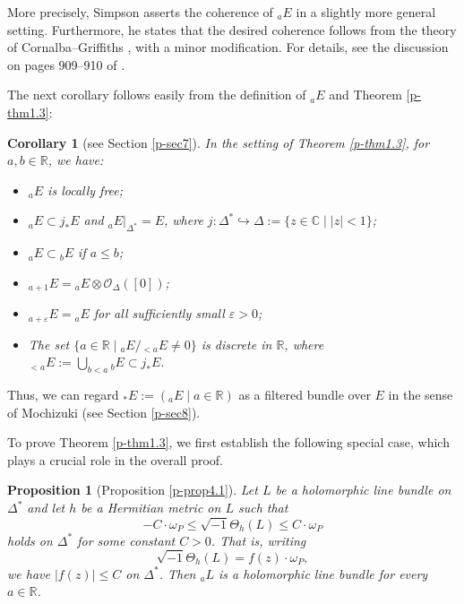 \documentclass[12pt,twoside]{amsart}
\newtheorem{cor}[thm]{Corollary}
\newtheorem{prop}[thm]{Proposition}
\theoremstyle{definition}
\begin{document}
More precisely, Simpson asserts the 
coherence of ${}_a E$ in a slightly more general setting.
Furthermore, he states that the desired coherence 
follows from the theory 
of Cornalba--Griffiths \cite{cornalba-griffiths}, with a minor modification. 
For details, see the discussion on pages 909--910 of \cite{simpson1}.

The next corollary follows easily from the definition of ${}_a E$ and Theorem \ref{p-thm1.3}:

\begin{cor}[see Section \ref{p-sec7}]\label{p-cor1.4}
In the setting of Theorem \ref{p-thm1.3}, for $a, b \in \mathbb{R}$, we have:
\begin{itemize}
\item[(i)] ${}_a E$ is locally free;
\item[(ii)] ${}_a E \subset j_*E$ and 
${}_a E|_{\Delta^*} = E$, where 
$j\colon \Delta^* \hookrightarrow \Delta := \{z \in \mathbb{C} \mid |z| < 1\}$;
\item[(iii)] ${}_a E \subset {}_b E$ if $a \leq b$;
\item[(iv)] ${}_{a+1}E = {}_a E \otimes \mathcal{O}_\Delta([0])$;
\item[(v)] ${}_{a+\varepsilon}E = {}_a E$ for 
all sufficiently small $\varepsilon > 0$;
\item[(vi)] The set $\{a \in \mathbb{R} \mid {}_a E / {}_{<a} E \neq 0\}$ 
is discrete in $\mathbb{R}$, 
where ${}_{<a} E := \bigcup_{b < a} {}_b E \subset j_*E$.
\end{itemize}
\end{cor}

Thus, we can regard ${}_\ast E 
:= \left( {}_a E \mid a \in \mathbb{R} \right)$ 
as a filtered bundle over $E$ in the sense of Mochizuki 
(see Section \ref{p-sec8}).

To prove Theorem \ref{p-thm1.3}, we first 
establish the following special case, which plays a crucial role in the overall proof.

\begin{prop}[Proposition \ref{p-prop4.1}]\label{p-prop1.5} 
Let $L$ be a holomorphic line bundle 
on $\Delta^*$ and let $h$ be a Hermitian metric on $L$ such that
\[
-C \cdot \omega_P \leq \sqrt{-1} \Theta_h(L) \leq C \cdot \omega_P
\]
holds on $\Delta^*$ for some constant $C > 0$.
That is, writing
\[
\sqrt{-1} \Theta_h(L) = f(z) \cdot \omega_P,
\]
we have $|f(z)| \leq C$ on $\Delta^*$. 
Then ${}_a L$ is a holomorphic line bundle for every $a \in \mathbb{R}$.
\end{prop}
\end{document}

